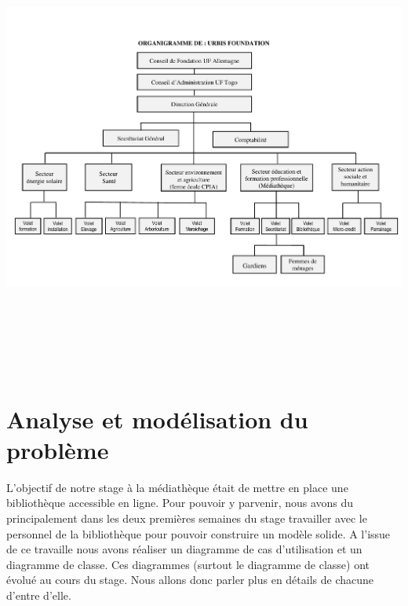\documentclass[14pt,a4paper]{article}
\begin{document}
\includegraphics[width=16cm,height=15cm]{./images/ORGANIGRAMME.pdf} 
\newpage
\section{Analyse et modélisation du problème}
L'objectif de notre stage à la médiathèque était de mettre en place une bibliothèque accessible en ligne. Pour pouvoir y parvenir, nous avons du principalement dans les deux premières semaines du stage travailler avec le personnel de la bibliothèque pour pouvoir construire un modèle solide. A l'issue 
de ce travaille nous avons réaliser un diagramme de cas d'utilisation et un 
diagramme de classe. Ces diagrammes (surtout le diagramme de classe) ont évolué
au cours du stage. Nous allons donc parler plus en détails de chacune d'entre d'elle.
\end{document}
